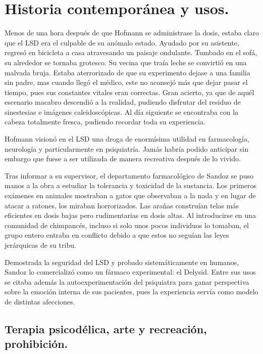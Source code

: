\section{Historia contemporánea y usos.}

Menos de una hora después de que Hofmann se administrase la dosis, estaba claro que el LSD era el culpable de su anómalo estado. Ayudado por su asistente, regresó en bicicleta a casa atravesando un paisaje ondulante. Tumbado en el sofá, su alrededor se tornaba grotesco. Su vecina que traía leche se convirtió en una malvada bruja. Estaba aterrorizado de que su experimento dejase a una familia sin padre, mas cuando llegó el médico, este no aconsejó más que dejar pasar el tiempo, pues sus constantes vitales eran correctas. Gran acierto, ya que de aquél escenario macabro descendió a la realidad, pudiendo disfrutar del residuo de sinestesias e imágenes caleidoscópicas. Al día siguiente se encontraba con la cabeza totalmente fresca, pudiendo recordar toda su experiencia.

Hofmann visionó en el LSD una droga de enormísima utilidad en farmacología, neurología y particularmente en psiquiatría. Jamás habría podido anticipar sin embargo que fuese a ser utilizada de manera recreativa después de lo vivido.

Tras informar a su supervisor, el departamento farmacológico de Sandoz se puso manos a la obra a estudiar la tolerancia y toxicidad de la sustancia. Los primeros exámenes en animales mostraban a gatos que observaban a la nada y en lugar de atacar a ratones, los miraban horrorizados. Las arañas construían telas más eficientes en dosis bajas pero rudimentarias en dosis altas. Al introducirse en una comunidad de chimpancés, incluso si solo unos pocos individuos lo tomaban, el grupo entero entraba en conflicto debido a que estos no seguían las leyes jerárquicas de su tribu.

Demostrada la seguridad del LSD y probado sistemáticamente en humanos, Sandoz lo comercializó como un fármaco experimental: el Delysid. Entre sus usos se citaba además la autoexperimentación del psiquiatra para ganar perspectiva sobre la emoción interna de sus pacientes, pues la experiencia servía como modelo de distintas afecciones.

\subsection{Terapia psicodélica, arte y recreación, prohibición.}

